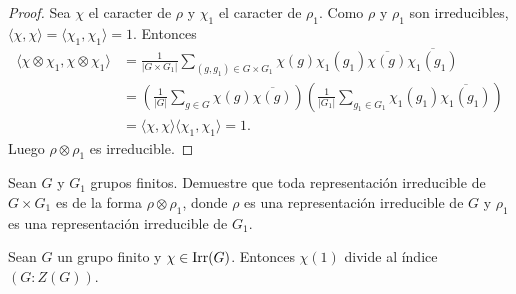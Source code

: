 \begin{proof}
    Sea $\chi$ el caracter de $\rho$ y $\chi_1$ el caracter de $\rho_1$. 
    Como $\rho$ y $\rho_1$ son irreducibles, $\langle\chi,\chi\rangle=\langle\chi_1,\chi_1\rangle=1$. Entonces
    \begin{align*}
    \langle\chi\otimes\chi_1,\chi\otimes\chi_1\rangle
    &=\frac{1}{|G\times G_1|}\sum_{(g,g_1)\in G\times G_1}\chi(g)\chi_1(g_1)\overline{\chi(g)}\overline{\chi_1(g_1)}\\
    &=\left(\frac{1}{|G|}\sum_{g\in G}\chi(g)\overline{\chi(g)}\right)\left(\frac{1}{|G_1|}\sum_{g_1\in G_1}\chi_1(g_1)\overline{\chi_1(g_1)}\right)\\
    &=\langle\chi,\chi\rangle\langle\chi_1,\chi_1\rangle=1.
    \end{align*}
    Luego $\rho\otimes\rho_1$ es irreducible. 
\end{proof}

\begin{exercise}
    Sean $G$ y $G_1$ grupos finitos. 
    Demuestre que toda representación irreducible de $G\times G_1$ es de la forma $\rho\otimes\rho_1$, donde $\rho$ es una representación
    irreducible de $G$ y $\rho_1$ es una representación irreducible de $G_1$. 
\end{exercise}

\begin{theorem}[Schur]
    Sean $G$ un grupo finito y $\chi\in\operatorname{Irr}(G)$. Entonces $\chi(1)$ divide al índice $(G:Z(G))$.
\end{theorem}

